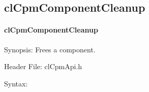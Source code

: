 {\subsection{clCpmComponentCleanup}
\hypertarget{pagecpm127}{}\paragraph{cl\-Cpm\-Component\-Cleanup}\label{pagecpm127}
\begin{Desc}
\item[Synopsis:]Frees a component.\end{Desc}
\begin{Desc}
\item[Header File:]clCpmApi.h\end{Desc}
\begin{Desc}
\item[Syntax:]


\end{Desc}}
